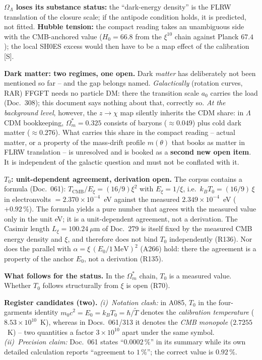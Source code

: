 \textbf{$\Omega_\Lambda$ loses its substance status:} the
\enquote{dark-energy density} is the FLRW translation of the
closure scale; if the antipode condition holds, it is predicted,
not fitted. \textbf{Hubble tension:} the compact reading takes an
unambiguous side with the CMB-anchored value ($H_0 = 66.8$ from
the $\xi^{10}$ chain against Planck $67.4$); the local SH0ES
excess would then have to be a map effect of the calibration [S].

\textbf{Dark matter: two regimes, one open.} Dark \emph{matter}
has deliberately not been mentioned so far -- and the gap belongs
named. \emph{Galactically} (rotation curves, RAR) FFGFT needs no
particle DM: there the transition scale $a_0$ carries the load
(Doc.~308); this document says nothing about that, correctly so.
\emph{At the background level}, however, the $z\to\chi$ map
silently inherits the CDM share: in $\Lambda$CDM bookkeeping,
$\Omega_m^{*} = 0.325$ consists of baryons ($\approx 0.049$)
plus cold dark matter ($\approx 0.276$). What carries this share
in the compact reading -- actual matter, or a property of the
mass-drift profile $m(\theta)$ that books as matter in FLRW
translation -- is unresolved and is booked as a \textbf{second
new open item}. It is independent of the galactic question and
must not be conflated with it.

\textbf{$T_0$: unit-dependent agreement, derivation open.} The
corpus contains a formula (Doc.~061):
$T_\text{CMB}/E_\xi = (16/9)\xi^2$ with $E_\xi = 1/\xi$, i.e.\
$k_BT_0 = (16/9)\,\xi$ in electronvolts $= 2.370\times10^{-4}$~eV
against the measured $2.349\times10^{-4}$~eV ($+0.92\,\%$). The
formula yields a pure number that agrees with the measured value
only in the unit eV; it is a unit-dependent agreement, not a
derivation. The Casimir length $L_\xi = 100.24~\mu$m of Doc.~279
is itself fixed by the measured CMB energy density and $\xi$, and
therefore does not bind $T_0$ independently (R136). Nor does the
parallel with $\alpha = \xi\,(E_0/1\,\text{MeV})^2$ (A266) hold:
there the agreement is a property of the anchor $E_0$, not a
derivation (R135).

\textbf{What follows for the status.} In the $\Omega_m^{*}$
chain, $T_0$ is a measured value. Whether $T_0$ follows
structurally from $\xi$ is open (R70).

\textbf{Register candidates (two).} \emph{(i)~Notation clash:} in
A085, $T_0$ in the four-garments identity
$m_0c^2 = E_0 = k_BT_0 = \hbar/\tilde T$ denotes the
\emph{calibration temperature} ($8.53\times10^{10}$~K), whereas in
Docs.~061/313 it denotes the \emph{CMB monopole} ($2.7255$~K) --
two quantities a factor $3\times10^{10}$ apart under the same
symbol. \emph{(ii)~Precision claim:} Doc.~061 states
\enquote{$0.0002\,\%$} in its summary while its own detailed
calculation reports \enquote{agreement to $1\,\%$}; the correct
value is $0.92\,\%$.

